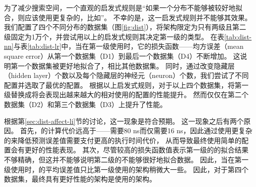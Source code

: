 为了减少搜索空间，一个直观的启发式规则是“如果一个分布不能够被{\lr}较好地拟合，则应该使用更复杂的{\model}，比如{\nn}”。
不幸的是，这一启发式规则并不能够其效果。
我们配置了四个不同分布的数据集（图\ref{fig:dist}），将{\li}架构限定为只有两级且第二级固定为1万个{\lr}，并尝试用以上的启发式规则其决定第一级的{\model}类型。
在表\ref{tab:dist-nn}与表\ref{tab:dist-lr}中，当在第一级使用{\lr}时，它的损失函数{------}均方误差（mean square error）从第一个数据集（D1）到最后一个数据集（D4）不断增加。
这说明第一个数据集被{\lr}更好地拟合了，相比其他数据集。
同时，通过改变隐藏层（hidden layer）个数以及每个隐藏层的神经元（neuron）个数，我们尝试了不同{\nn}配置并选取了最优的{\nn}配置。
根据以上启发式规则，对于以上四个数据集，将第一级{\model}替换成{\nn}将会表现出越来越大的相对使用{\lr}的{\li}配置的性能提升。
然而{\nn}仅仅在第二个数据集（D2）和第三个数据集（D3）上提升了性能。

根据第\ref{sec:dist-affect-li}节的讨论，这一现象是符合预期。
这一现象之后有两个原因。
首先，{\nn}的计算代价远高于{\lr}{------}{\nn}需要80 ns而{\lr}仅需要16 ns，因此通过使用更复杂的{\model}来降低预测误差值需要支付更高的{\model}执行时间代价，
从而导致最终使用简单{\model}的{\rmi}配置会有更好的性能表现。
其次，尽管较高的损失函数值表示第一级的{\lr}的拟合结果不够精确，但这并不能够说明第二级的{\model}不能够很好地拟合数据。
因此，当在第一级使用{\lr}时，{\model}的平均误差值只比第一级使用{\nn}的架构稍微大一些。
因此，对于第四个数据集，最终具有更好性能的架构是使用{\lr}的架构。


